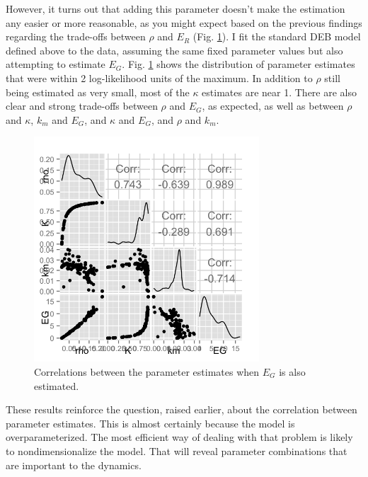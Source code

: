 \documentclass[12pt,reqno,final,pdftex]{amsart}\usepackage[]{graphicx}\usepackage[]{color}
\newenvironment{knitrout}{}{} %
\theoremstyle{plain}
\numberwithin{equation}{part}
\begin{document}
However, it turns out that adding this parameter doesn't make the estimation any easier or more reasonable, as you might expect based on the previous findings regarding the trade-offs between $\rho$ and $E_R$ (Fig. \ref{fig:with-EG-scatter}).
I fit the standard DEB model defined above to the data, assuming the same fixed parameter values but also attempting to estimate $E_G$.
Fig. \ref{fig:with-EG-scatter} shows the distribution of parameter estimates that were within 2 log-likelihood units of the maximum.
In addition to $\rho$ still being estimated as very small, most of the $\kappa$ estimates are near 1.
There are also clear and strong trade-offs between $\rho$ and $E_G$, as expected, as well as between $\rho$ and $\kappa$, $k_m$ and $E_G$, and $\kappa$ and $E_G$, and $\rho$ and $k_m$.
\begin{knitrout}\scriptsize
{}\color{fgcolor}\begin{figure}

\includegraphics[width=0.75\textwidth]{figure/with-EG-scatter-1} \hfill{}

\caption[Correlations between the parameter estimates when ]{Correlations between the parameter estimates when $E_G$ is also estimated.}\label{fig:with-EG-scatter}
\end{figure}


\end{knitrout}

These results reinforce the question, raised earlier, about the correlation between parameter estimates.
This is almost certainly because the model is overparameterized.
The most efficient way of dealing with that problem is likely to nondimensionalize the model.
That will reveal parameter combinations that are important to the dynamics.
\end{document}
